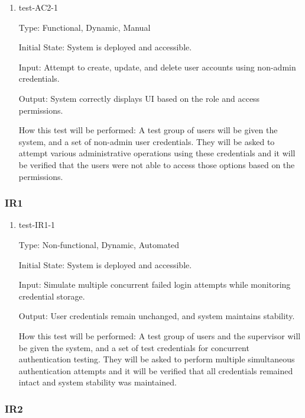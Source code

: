 \documentclass[12pt, titlepage]{article}
\begin{document}
\begin{enumerate}
    \item{test-AC2-1}  \label{test-AC2-1}
    
    Type: Functional, Dynamic, Manual
    
    Initial State: System is deployed and accessible.
    
    Input: Attempt to create, update, and delete user accounts using non-admin credentials.
    
    Output: System correctly displays UI based on the role and access permissions.

    How this test will be performed: A test group of users will be given the system, and a set of non-admin user credentials. They will be asked to attempt various administrative operations using these credentials and it will be verified that the users were not able to access those options based on the permissions.

\end{enumerate}

\subsubsection{IR1}

\begin{enumerate}

    \item{test-IR1-1}  \label{test-IR1-1}
    
    Type: Non-functional, Dynamic, Automated
    
    Initial State: System is deployed and accessible.
    
    Input: Simulate multiple concurrent failed login attempts while monitoring credential storage.

    Output: User credentials remain unchanged, and system maintains stability.
    
    How this test will be performed: A test group of users and the supervisor will be given the system, and a set of test credentials for concurrent authentication testing. They will be asked to perform multiple simultaneous authentication attempts and it will be verified that all credentials remained intact and system stability was maintained.

  \end{enumerate}

\subsubsection{IR2}
  
\end{document}
